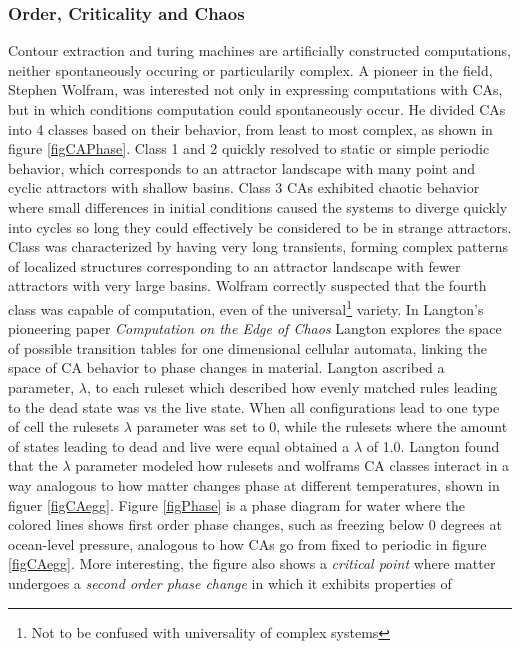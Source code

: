 \subsubsection{Order, Criticality and Chaos}
Contour extraction and turing machines are artificially constructed
computations, neither spontaneously occuring or particularily complex.
A pioneer in the field, Stephen Wolfram, was interested not only in expressing
computations with CAs, but in which conditions computation could spontaneously
occur.
He divided CAs into 4 classes based on their behavior\cite{WOLFRAM84}, from least to most
complex, as shown in figure \ref{figCAPhase}.
Class 1 and 2 quickly resolved to static or simple periodic behavior, which
corresponds to an attractor landscape with many point and cyclic attractors with
shallow basins.
Class 3 CAs exhibited chaotic behavior where small differences in initial
conditions caused the systems to diverge quickly into cycles so long they could
effectively be considered to be in strange attractors.
Class was characterized by having very long transients, forming complex
patterns of localized structures corresponding to an attractor landscape with
fewer attractors with very large basins.
Wolfram correctly suspected that the fourth class was capable of computation,
even of the universal\footnote{Not to be confused with
  universality of complex systems} variety.
%
In Langton's pioneering paper \emph{Computation on the Edge of Chaos}
\cite{LANGTON91} Langton explores the space of possible
transition tables for one dimensional cellular automata, linking the space of CA
behavior to phase changes in material.
%
Langton ascribed a parameter, $\lambda$, to each ruleset which described how evenly
matched rules leading to the dead state was vs the live state.
When all configurations lead to one type of cell the rulesets $\lambda$
parameter was set to 0, while the rulesets where the amount of states leading to
dead and live were equal obtained a $\lambda$ of 1.0.
%
Langton found that the $\lambda$ parameter modeled how rulesets and wolframs CA
classes interact in a way analogous to how matter changes phase at different
temperatures, shown in figuer \ref{figCAegg}.
%
Figure \ref{figPhase} is a phase diagram for water where the colored lines shows
first order phase changes, such as freezing below 0 degrees at ocean-level
pressure, analogous to how CAs go from fixed to periodic in figure \ref{figCAegg}.
%
More interesting, the figure also shows a \emph{critical point} where matter
undergoes a \emph{second order phase change} in which it exhibits properties of
